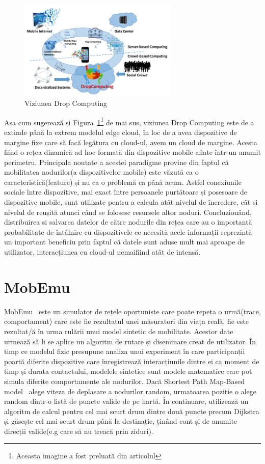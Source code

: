 \documentclass[12pt,a4paper]{report}
\begin{document}
\begin{figure}[th]
\centering
\includegraphics[width=3in]{pics/dropComputing.png}
  \caption{Viziunea Drop Computing}
  \label{fig:pic2}
\end{figure}
Așa cum sugerează și Figura~\ref{fig:pic2}\footnote{Aceasta imagine a fost preluată din articolul\cite{DC}} de mai sus, viziunea Drop Computing este de a extinde până la extrem modelul edge cloud, în loc de a avea dispozitive de margine fixe care să facă legătura cu cloud-ul, avem un cloud de margine. Acesta fiind o rețea dinamică ad hoc formată din dispozitive mobile aflate într-un anumit perimetru. Principala noutate a acestei paradigme provine din faptul că mobilitatea nodurilor(a dispozitivelor mobile) este văzută ca o caracteristică(feature) și nu ca o problemă ca până acum. Astfel conexiunile sociale între dispozitive, mai exact între persoanele purtătoare și posesoare de dispozitive mobile, sunt utilizate pentru a calcula atât nivelul de încredere, cât si nivelul de reușită atunci când se folosesc resursele altor noduri. Concluzionând, distribuirea si salvarea datelor de către nodurile din rețea care au o importantă probabilitate de întâlnire cu dispozitivele ce necesită acele informații reprezintă un important beneficiu prin faptul că datele sunt aduse mult mai aproape de utilizator, interacțiunea cu cloud-ul nemaifiind atât de intensă.
\section{MobEmu}
MobEmu~\cite{MobEmuArticle} este un simulator de rețele oportuniste care poate repeta o urmă(trace, comportament) care este fie rezultatul unei măsuratori din viața reală, fie este rezultat/ă în urma rulării unui model sintetic de mobilitate. Acestor date urmează să li se aplice un algoritm de rutare și diseminare creat de utilizator.
În timp ce modelul fizic presupune analiza unui experiment în care participanții poartă diferite dispozitive care înregistrează interacțiunile dintre ei ca moment de timp și durata contactului, modelele sintetice sunt modele matematice care pot simula diferite comportamente ale nodurilor. Dacă Shortest Path Map-Based model~\cite{ShortestPathMapBased} alege viteza de deplasare a nodurilor random, urmatoarea poziție o alege random dintr-o listă de puncte valide de pe hartă. În continuare, utilizează un algoritm de calcul pentru cel mai scurt drum dintre două puncte precum Dijkstra și găsește cel mai scurt drum până la destinație, ținând cont și de anumite direcții valide(e.g care să nu treacă prin ziduri). 
\end{document}
